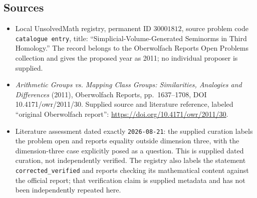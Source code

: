 \documentclass[11pt]{article}
\begin{document}
\subsection{Sources}
\begin{itemize}
\item Local UnsolvedMath registry, permanent ID \(30001812\), source problem code \texttt{catalogue entry}, title: ``Simplicial-Volume-Generated Seminorms in Third Homology.'' The record belongs to the Oberwolfach Reports Open Problems collection and gives the proposed year as 2011; no individual proposer is supplied.
\item \emph{Arithmetic Groups vs. Mapping Class Groups: Similarities, Analogies and Differences} (2011), Oberwolfach Reports, pp.\ 1637--1708, DOI 10.4171/owr/2011/30. Supplied source and literature reference, labeled ``original Oberwolfach report'': \url{https://doi.org/10.4171/owr/2011/30}.
\item Literature assessment dated exactly \texttt{2026-08-21}: the supplied curation labels the problem open and reports equality outside dimension three, with the dimension-three case explicitly posed as a question. This is supplied dated curation, not independently verified. The registry also labels the statement \texttt{corrected\_verified} and reports checking its mathematical content against the official report; that verification claim is supplied metadata and has not been independently repeated here.
\end{itemize}
\end{document}
